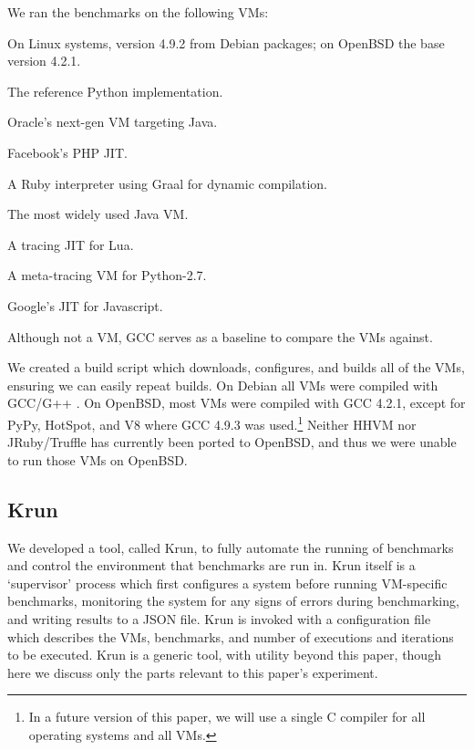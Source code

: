 \documentclass[10pt,preprint]{sigplanconf}
\newcommand{\krun}{Krun\xspace}
\begin{document}
We ran the benchmarks on the following VMs:
\begin{description*}
\item[GCC] On Linux systems, version 4.9.2 from Debian packages; on OpenBSD the base version 4.2.1.
\item[CPython 2.7.10] The reference Python implementation.
\item[Graal \#9dafd1dc5ff9] Oracle's next-gen VM targeting Java.
\item[HHVM 3.7.1] Facebook's PHP JIT.
\item[JRuby/Truffle \#7f4cd59cdd1c8] A Ruby interpreter using Graal for dynamic compilation.
\item[HotSpot 8u45b14] The most widely used Java VM.
\item[LuaJIT 2.0.4] A tracing JIT for Lua.
\item[PyPy 4.0.0] A meta-tracing VM for Python-2.7.
\item[V8 4.8.271.9] Google's JIT for Javascript.
\end{description*}
Although not a VM, GCC serves as a baseline to compare the VMs against.

We created a build script which downloads, configures, and builds all of the
VMs, ensuring we can easily repeat builds.
On Debian all VMs were compiled with GCC/G++ . On OpenBSD,
most VMs were compiled with GCC 4.2.1, except for PyPy, HotSpot, and V8 where
GCC 4.9.3 was used.\footnote{In a future version of this paper, we will use a
single C compiler for all operating systems and all VMs.} Neither HHVM nor
JRuby/Truffle has currently been ported to OpenBSD, and thus we were unable to
run those VMs on OpenBSD.


\subsection{\krun}

We developed a tool, called \krun, to fully automate the running of benchmarks
and control the environment that benchmarks are run in. \krun itself is a
`supervisor' process which first configures a system before running VM-specific
benchmarks, monitoring the system for any signs of errors during benchmarking,
and writing results to a JSON file. \krun is invoked with a configuration file
which describes the VMs, benchmarks, and number of executions and iterations to
be executed. \krun is a generic tool, with utility beyond this paper, though
here we discuss only the parts relevant to this paper's experiment. 
\end{document}
